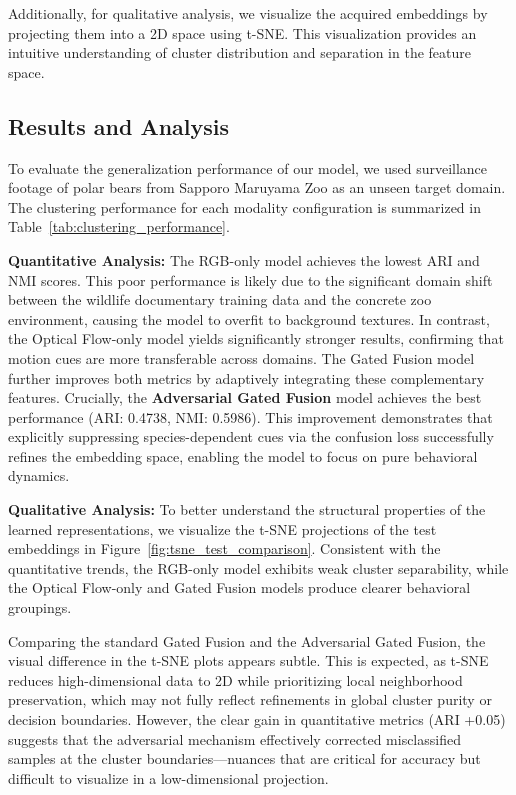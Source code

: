 \documentclass[fleqn,10pt,twocolumn]{AROB}
\begin{document}
Additionally, for qualitative analysis, we visualize the acquired embeddings by projecting them into a 2D space using t-SNE.
This visualization provides an intuitive understanding of cluster distribution and separation in the feature space.

\subsection{Results and Analysis}

To evaluate the generalization performance of our model, we used surveillance footage of polar bears from Sapporo Maruyama Zoo as an unseen target domain.
The clustering performance for each modality configuration is summarized in Table~\ref{tab:clustering_performance}.

\textbf{Quantitative Analysis:}
The RGB-only model achieves the lowest ARI and NMI scores. This poor performance is likely due to the significant domain shift between the wildlife documentary training data and the concrete zoo environment, causing the model to overfit to background textures.
In contrast, the Optical Flow-only model yields significantly stronger results, confirming that motion cues are more transferable across domains.
The Gated Fusion model further improves both metrics by adaptively integrating these complementary features.
Crucially, the \textbf{Adversarial Gated Fusion} model achieves the best performance (ARI: 0.4738, NMI: 0.5986). This improvement demonstrates that explicitly suppressing species-dependent cues via the confusion loss successfully refines the embedding space, enabling the model to focus on pure behavioral dynamics.

\textbf{Qualitative Analysis:}
To better understand the structural properties of the learned representations, we visualize the t-SNE projections of the test embeddings in Figure~\ref{fig:tsne_test_comparison}.
Consistent with the quantitative trends, the RGB-only model exhibits weak cluster separability, while the Optical Flow-only and Gated Fusion models produce clearer behavioral groupings.

Comparing the standard Gated Fusion and the Adversarial Gated Fusion, the visual difference in the t-SNE plots appears subtle.
This is expected, as t-SNE reduces high-dimensional data to 2D while prioritizing local neighborhood preservation, which may not fully reflect refinements in global cluster purity or decision boundaries.
However, the clear gain in quantitative metrics (ARI +0.05) suggests that the adversarial mechanism effectively corrected misclassified samples at the cluster boundaries—nuances that are critical for accuracy but difficult to visualize in a low-dimensional projection.
\end{document}
